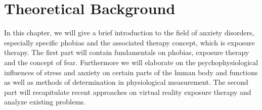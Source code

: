 
\section{Theoretical Background}

In this chapter, we will give a brief introduction to the field of anxiety disorders, especially specific phobias and the associated therapy concept, which is exposure therapy. The first part will contain fundamentals on phobias, exposure therapy and the concept of fear. Furthermore we will elaborate on the psychophysiological influences of stress and anxiety on certain parts of the human body and functions as well as methods of determination in physiological measurement. The second part will recapitulate recent approaches on virtual reality exposure therapy and analyze existing problems. 

